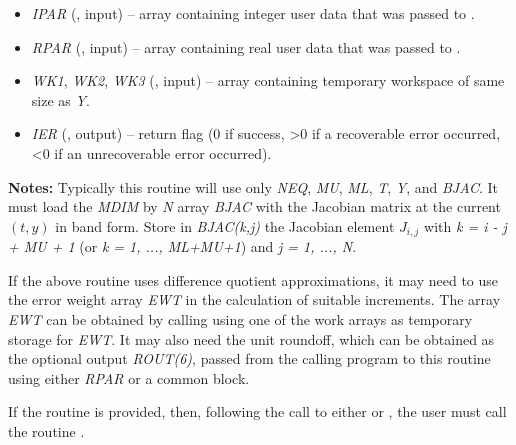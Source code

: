 \documentclass[letterpaper,10pt,english]{sphinxmanual}
\begin{document}
\begin{fulllineitems}
\begin{description}
\begin{itemize}
\item {} 
\emph{IPAR} (, input) -- array containing integer user data that was passed to
{\hyperref[f_interface/Usage:f/_/FARKMALLOC]{\emph{}}}.

\item {} 
\emph{RPAR} (, input) -- array containing real user data that was passed to
{\hyperref[f_interface/Usage:f/_/FARKMALLOC]{\emph{}}}.

\item {} 
\emph{WK1}, \emph{WK2}, \emph{WK3}  (, input) -- array containing temporary workspace
of same size as \emph{Y}.

\item {} 
\emph{IER} (, output) -- return flag (0 if success, \textgreater{}0 if a recoverable error
occurred, \textless{}0 if an unrecoverable error occurred).

\end{itemize}

\end{description}

\textbf{Notes:}
Typically this routine will use only \emph{NEQ}, \emph{MU}, \emph{ML}, \emph{T}, \emph{Y}, and
\emph{BJAC}. It must load the \emph{MDIM} by \emph{N} array \emph{BJAC} with the Jacobian
matrix at the current \((t,y)\) in band form.  Store in
\emph{BJAC(k,j)} the Jacobian element \(J_{i,j}\) with
\emph{k = i - j + MU + 1} (or \emph{k = 1, ..., ML+MU+1}) and \emph{j = 1, ..., N}.

\end{fulllineitems}


If the above routine uses difference quotient approximations, it may
need to use the error weight array \emph{EWT} in the calculation of
suitable increments. The array \emph{EWT} can be obtained by calling
{\hyperref[f_interface/Optional_output:f/_/FARKGETERRWEIGHTS]{\emph{}}} using one of the work
arrays as temporary storage for \emph{EWT}. It may also need the unit
roundoff, which can be obtained as the optional output \emph{ROUT(6)},
passed from the calling program to this routine using either \emph{RPAR}
or a common block.

If the {\hyperref[f_interface/Usage:f/_/FARKBJAC]{\emph{}}} routine is provided, then, following the
call to either {\hyperref[f_interface/Usage:f/_/FARKBAND]{\emph{}}} or {\hyperref[f_interface/Usage:f/_/FARKLAPACKBAND]{\emph{}}}, the
user must call the routine {\hyperref[f_interface/Usage:f/_/FARKBANDSETJAC]{\emph{}}}.
\end{document}
